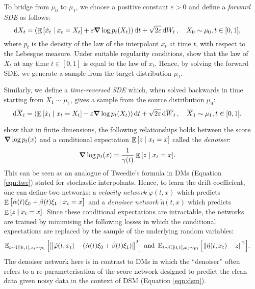 To bridge from \(\mu_{0}\) to \(\mu_{1}\), we choose a positive constant \(\varepsilon > 0\) and define a \textit{forward SDE} as follows:
\begin{equation}
  \dd{X_{t}} = \qty(\mathop{\mathbb{E}}\qty[\dot{x}_{t} \mid x_{t} = X_{t}] + \varepsilon \grad \log p_{t}(X_{t}))\dd{t} + \sqrt{2\varepsilon} \dd{W_{t}}, \quad X_{0} \sim \mu_{0}, t \in [0, 1], \label{eqn:sif}
\end{equation}
where \(p_{t}\) is the density of the law of the interpolant \(x_{t}\) at time \(t\), with respect to the Lebesgue measure. Under suitable regularity conditions, \citet{albergo2023stochasticinterpolantsunifyingframework} show that the law of \(X_{t}\) at any time \(t \in [0, 1]\) is equal to the law of \(x_{t}\). Hence, by solving the forward SDE, we generate a sample from the target distribution \(\mu_{1}\). %

Similarly, we define a \textit{time-reversed SDE} which, when solved backwards in time starting from \(\overline{X}_{1} \sim \mu_{1}\), gives a sample from the source distribution \(\mu_{0}\):
\begin{equation}
  \dd{ \overline{X}_{t}} = \qty(\mathop{\mathbb{E}}\qty[\dot{x}_{t} \mid x_{t} = X_{t}] - \varepsilon \grad \log p_{t}(X_{t}))\dd{t} + \sqrt{2\varepsilon} \dd{ \overline{W}_{t}}, \quad \overline{X}_{1} \sim \mu_{1}, t \in [0, 1].\label{eqn:sib}
\end{equation}

\citet[Theorem 2.8]{albergo2023stochasticinterpolantsunifyingframework} show that in finite dimensions, the following relationships holds between the score \(\grad \log p_{t}(x)\) and a conditional expectation \(\mathop{\mathbb{E}}\qty[z \mid x_{t} = x]\) called the \textit{denoiser}:
\[
  \grad \log p_{t}(x) = \frac{1}{\gamma(t)} \mathop{\mathbb{E}}\qty[z \mid x_{t} = x].
\]
This can be seen as an analogue of Tweedie's formula in DMs (Equation \ref{eqn:twe}) stated for stochastic interpolants. Hence, to learn the drift coefficient, one can define two networks: a \textit{velocity network} \(\widetilde{\varphi}(t, x)\) which predicts \(\mathop{\mathbb{E}}\qty[\dot{\alpha}(t)\xi_{0} + \dot{\beta}(t)\xi_{1} \mid x_{t} = x]\) and a \textit{denoiser network} \(\widetilde{\eta}(t, x)\) which predicts \(\mathop{\mathbb{E}}\qty[z \mid x_{t} = x]\). Since these conditional expectations are intractable, the networks are trained by minimising the following losses in which the conditional expectations are replaced by the sample of the underlying random variables:
\[
  \mathop{\mathbb{E}_{t \sim \operatorname{U}[0, 1], x_{t} \sim p_{t}}}\qty[ \norm{\widetilde{\varphi}(t, x_{t}) - (\dot{\alpha}(t)\xi_{0} + \dot{\beta}(t)\xi_{1})}^{2} ] \text{ and } \mathop{\mathbb{E}_{t \sim \operatorname{U}[0, 1], x_{t} \sim p_{t}}}\qty[\norm{\widetilde{\eta}(t, x_{t}) - z}^{2}].
\]
The denoiser network here is in contrast to DMs in which the ``denoiser'' often refers to a re-parameterisation of the score network designed to predict the clean data given noisy data in the context of DSM (Equation \ref{eqn:dsm}).

